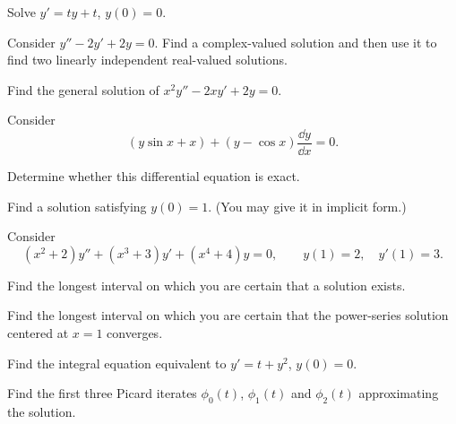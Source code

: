 \documentclass[11pt,oneside]{article}
\begin{document}
\begin{problem}
Solve $y'=ty+t$, $y(0)=0$.
\end{problem}

\begin{problem}
Consider $y''-2y'+2y=0$. Find a complex-valued solution and then use it to find two linearly independent real-valued solutions.
\end{problem}

\begin{problem}
Find the general solution of $x^2y''-2xy'+2y=0$.
\end{problem}

\begin{problem}
Consider
\[
(y\sin x+x)+(y-\cos x)\frac{\dd y}{\dd x}=0.
\]
\begin{problemsubparts}
\item Determine whether this differential equation is exact.
\item Find a solution satisfying $y(0)=1$. (You may give it in implicit form.)
\end{problemsubparts}
\end{problem}

\begin{problem}
Consider
\[
(x^2+2)y''+(x^3+3)y'+(x^4+4)y=0,\qquad y(1)=2,\quad y'(1)=3.
\]
\begin{problemsubparts}
\item Find the longest interval on which you are certain that a solution exists.
\item Find the longest interval on which you are certain that the power-series solution centered at $x=1$ converges.
\end{problemsubparts}
\end{problem}

\begin{problem}
\begin{problemsubparts}
\item Find the integral equation equivalent to $y'=t+y^2$, $y(0)=0$.
\item Find the first three Picard iterates $\phi_0(t)$, $\phi_1(t)$ and $\phi_2(t)$ approximating the solution.
\end{problemsubparts}
\end{problem}
\end{document}
